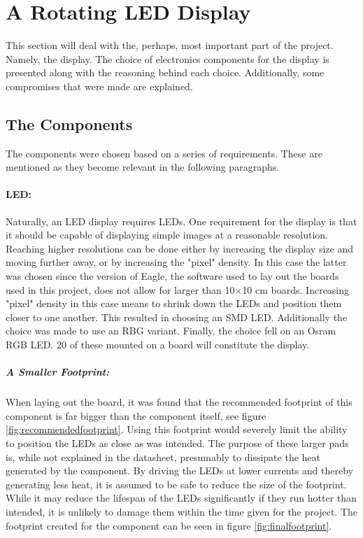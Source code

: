 \section{A Rotating LED Display}
This section will deal with the, perhaps, most important part of the project.
Namely, the display.
The choice of electronics components for the display is presented along with the reasoning behind each choice.
Additionally, some compromises that were made are explained.

\subsection{The Components}
The components were chosen based on a series of requirements.
These are mentioned as they become relevant in the following paragraphs.

\paragraph{LED:}
Naturally, an LED display requires LEDs.
One requirement for the display is that it should be capable of displaying simple images at a reasonable resolution.
Reaching higher resolutions can be done either by increasing the display size and moving further away, or by increasing the "pixel" density.
In this case the latter was chosen since the version of Eagle, the software used to lay out the boards used in this project, does not allow for larger than 10$\times$10 cm boards.
Increasing "pixel" density in this case means to shrink down the LEDs and position them closer to one another.
This resulted in choosing an SMD LED.
Additionally the choice was made to use an RBG variant.
Finally, the choice fell on an Osram RGB LED.
20 of these mounted on a board will constitute the display.

\subparagraph{A Smaller Footprint:}
When laying out the board, it was found that the recommended footprint of this component is far bigger than the component itself, see figure \ref{fig:recommendedfootprint}.
Using this footprint would severely limit the ability to position the LEDs as close as was intended.
The purpose of these larger pads is, while not explained in the datasheet, presumably to dissipate the heat generated by the component.
By driving the LEDs at lower currents and thereby generating less heat, it is assumed to be safe to reduce the size of the footprint.
While it may reduce the lifespan of the LEDs significantly if they run hotter than intended, it is unlikely to damage them within the time given for the project.
The footprint created for the component can be seen in figure 
\ref{fig:finalfootprint}.


